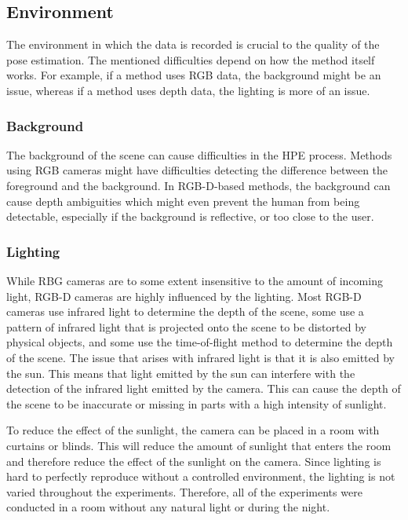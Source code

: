 \subsection{Environment}

The environment in which the data is recorded is crucial to the quality of the pose estimation. The mentioned difficulties depend on how the method itself works. For example, if a method uses RGB data, the background might be an issue, whereas if a method uses depth data, the lighting is more of an issue.

\subsubsection{Background}

The background of the scene can cause difficulties in the HPE process. Methods using RGB cameras might have difficulties detecting the difference between the foreground and the background. In RGB-D-based methods, the background can cause depth ambiguities which might even prevent the human from being detectable, especially if the background is reflective, or too close to the user.

\subsubsection{Lighting}

While RBG cameras are to some extent insensitive to the amount of incoming light, RGB-D cameras are highly influenced by the lighting. Most RGB-D cameras use infrared light to determine the depth of the scene, some use a pattern of infrared light that is projected onto the scene to be distorted by physical objects, and some use the time-of-flight method to determine the depth of the scene. The issue that arises with infrared light is that it is also emitted by the sun. This means that light emitted by the sun can interfere with the detection of the infrared light emitted by the camera. This can cause the depth of the scene to be inaccurate or missing in parts with a high intensity of sunlight.

To reduce the effect of the sunlight, the camera can be placed in a room with curtains or blinds. This will reduce the amount of sunlight that enters the room and therefore reduce the effect of the sunlight on the camera. Since lighting is hard to perfectly reproduce without a controlled environment, the lighting is not varied throughout the experiments. Therefore, all of the experiments were conducted in a room without any natural light or during the night.

